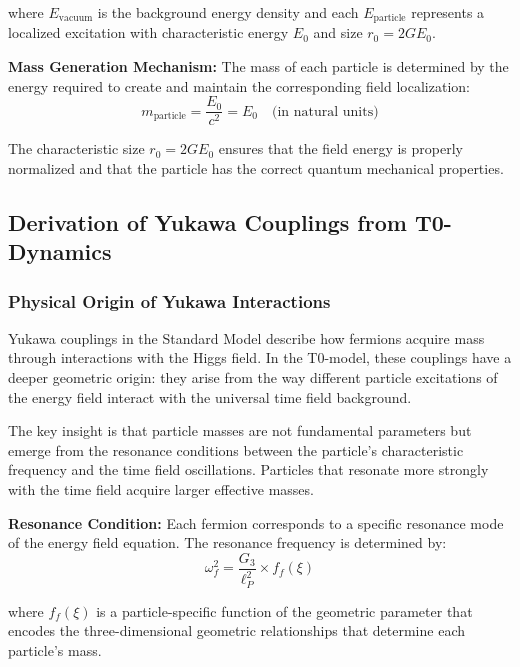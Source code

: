 \documentclass[12pt,a4paper]{article}
\begin{document}
	where $E_{\text{vacuum}}$ is the background energy density and each $E_{\text{particle}}$ represents a localized excitation with characteristic energy $E_0$ and size $r_0 = 2GE_0$.
	
	\textbf{Mass Generation Mechanism:} The mass of each particle is determined by the energy required to create and maintain the corresponding field localization:
	\begin{equation}
		m_{\text{particle}} = \frac{E_0}{c^2} = E_0 \quad \text{(in natural units)}
	\end{equation}
	
	The characteristic size $r_0 = 2GE_0$ ensures that the field energy is properly normalized and that the particle has the correct quantum mechanical properties.
	
	\subsection{Derivation of Yukawa Couplings from T0-Dynamics}
	
	\subsubsection{Physical Origin of Yukawa Interactions}
	
	Yukawa couplings in the Standard Model describe how fermions acquire mass through interactions with the Higgs field. In the T0-model, these couplings have a deeper geometric origin: they arise from the way different particle excitations of the energy field interact with the universal time field background.
	
	The key insight is that particle masses are not fundamental parameters but emerge from the resonance conditions between the particle's characteristic frequency and the time field oscillations. Particles that resonate more strongly with the time field acquire larger effective masses.
	
	\textbf{Resonance Condition:} Each fermion corresponds to a specific resonance mode of the energy field equation. The resonance frequency is determined by:
	\begin{equation}
		\omega_f^2 = \frac{G_3}{\ell_P^2} \times f_f(\xi)
	\end{equation}
	
	where $f_f(\xi)$ is a particle-specific function of the geometric parameter that encodes the three-dimensional geometric relationships that determine each particle's mass.
	
\end{document}
